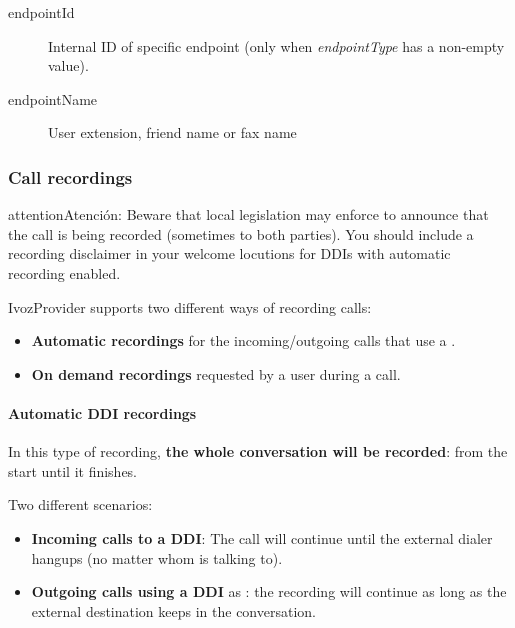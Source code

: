 \documentclass[letterpaper,10pt,spanish]{sphinxmanual}
\begin{document}
\begin{description}
\item[{endpointId}] \leavevmode{}\label{administration_portal/client/vpbx/calls/call_csv_schedulers:term-endpointid}
Internal ID of specific endpoint (only when \emph{endpointType} has a non-empty value).

\item[{endpointName}] \leavevmode{}\label{administration_portal/client/vpbx/calls/call_csv_schedulers:term-endpointname}
User extension, friend name or fax name

\end{description}


\subsubsection{Call recordings}
\label{administration_portal/client/vpbx/calls/call_recordings::doc}\label{administration_portal/client/vpbx/calls/call_recordings:call-recordings}\label{administration_portal/client/vpbx/calls/call_recordings:id1}
\begin{notice}{attention}{Atención:}
Beware that local legislation may enforce to announce that the
call is being recorded (sometimes to both parties). You should include
a recording disclaimer in your welcome locutions for DDIs with automatic
recording enabled.
\end{notice}

IvozProvider supports two different ways of recording calls:
\begin{itemize}
\item {} 
\textbf{Automatic recordings} for the incoming/outgoing calls that use a
{\hyperref[administration_portal/client/vpbx/ddis:ddis]{}}.

\item {} 
\textbf{On demand recordings} requested by a user during a call.

\end{itemize}


\paragraph{Automatic DDI recordings}
\label{administration_portal/client/vpbx/calls/call_recordings:automatic-ddi-recordings}
In this type of recording, \textbf{the whole conversation will be recorded}: from
the start until it finishes.

Two different scenarios:
\begin{itemize}
\item {} 
\textbf{Incoming calls to a DDI}: The call will continue until the external
dialer hangups (no matter whom is talking to).

\item {} 
\textbf{Outgoing calls using a DDI} as {\hyperref[administration_portal/client/vpbx/ddis:ddis]{}}: the
recording will continue as long as the external destination keeps in the
conversation.

\end{itemize}
\end{document}
